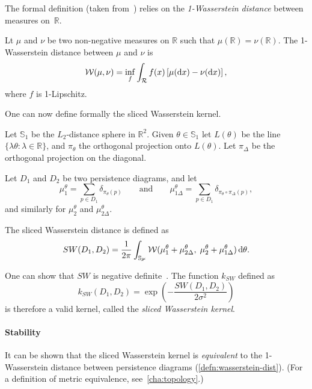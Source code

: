 \documentclass[a4paper,11pt,openany,extrafontsizes]{memoir}
\begin{document}
The formal definition (taken from~\cite{carriere_sliced_2017}) relies
on the \emph{1-Wasserstein distance} between measures on~$\mathbb{R}$.

\begin{defn}
  Lt $\mu$ and $\nu$ be two non-negative measures on $\mathbb{R}$ such
  that $\mu(\mathbb{R}) = \nu(\mathbb{R})$. The 1-Wasserstein distance
  between $\mu$ and $\nu$ is
  \[ \mathcal{W}(\mu, \nu) = \inf_{f} \int_{\mathcal{R}} f(x) \left[
    \mu(\mathop{}\!\mathrm{d} x) - \nu(\mathop{}\!\mathrm{d} x) \right], \]
  where $f$ is 1-Lipschitz.
\end{defn}

One can now define formally the sliced Wasserstein kernel.

\begin{defn}
  Let $\mathbb{S}_1$ be the $L_2$-distance sphere in
  $\mathbb{R}^2$. Given $\theta\in\mathbb{S}_1$ let $L(\theta)$ be the
  line $\{\lambda\theta : \lambda\in\mathbb{R}\}$, and $\pi_\theta$
  the orthogonal projection onto $L(\theta)$. Let $\pi_\Delta$ be the
  orthogonal projection on the diagonal.

  Let $D_1$ and $D_2$ be two persistence diagrams, and let
  \[\mu_1^\theta = \sum_{p\in D_1} \delta_{\pi_\theta(p)} \qquad\text{and}\qquad
    \mu_{1\Delta}^\theta = \sum_{p\in D_1}
    \delta_{\pi_\theta\circ\pi_\Delta(p)},\] and similarly for
  $\mu_2^\theta$ and $\mu_{2\Delta}^\theta$.

  The sliced Wasserstein distance is defined as
  \[ SW(D_1, D_2) = \frac{1}{2\pi} \int_{\mathbb{S_1}}
    \mathcal{W}(\mu_1^\theta + \mu_{2\Delta}^\theta,\; \mu_2^\theta +
    \mu_{1\Delta}^\theta) \mathop{}\!\mathrm{d}\theta. \]
\end{defn}

One can show that $SW$ is negative
definite~\cite{carriere_sliced_2017}. The function $k_{SW}$ defined as
\[ k_{SW}(D_1, D_2) = \exp\left(-\frac{SW(D_1,D_2)}{2\sigma^2}\right) \]
is therefore a valid kernel, called the \emph{sliced Wasserstein
  kernel}.

\paragraph{Stability}

It can be shown that the sliced Wasserstein kernel is
\emph{equivalent} to the 1-Wasserstein distance between persistence
diagrams (\autoref{defn:wasserstein-dist}). (For a definition of
metric equivalence, see~\autoref{cha:topology}.)
\end{document}
